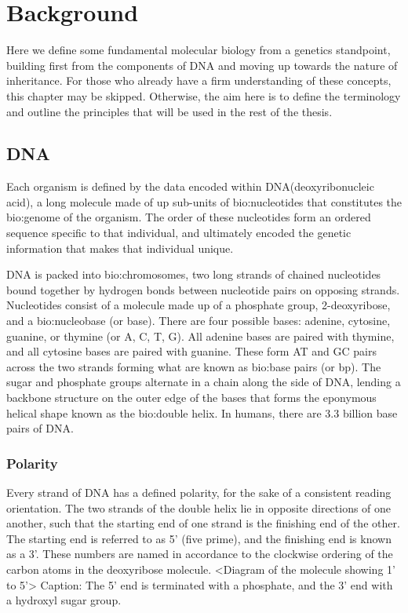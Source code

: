 

\chapter{Background}

Here we define some fundamental molecular biology from a genetics standpoint, building first from the components of DNA and moving up towards the nature of inheritance. For those who already have a firm understanding of these concepts, this chapter may be skipped. Otherwise, the aim here is to define the terminology and outline the principles that will be used in the rest of the thesis.

\section{DNA}

Each organism is defined by the data encoded within DNA(deoxyribonucleic acid), a long molecule made of up sub-units of \gls{bio:nucleotides} that constitutes the \gls{bio:genome} of the organism. The order of these nucleotides form an ordered sequence specific to that individual, and ultimately encoded the genetic information that makes that individual unique.

DNA is packed into \gls{bio:chromosomes}, two long strands of chained nucleotides bound together by hydrogen bonds between nucleotide pairs on opposing strands. Nucleotides consist of a molecule made up of a phosphate group, 2-deoxyribose, and a \gls{bio:nucleobase} (or base). There are four possible bases: adenine, cytosine, guanine, or thymine (or A, C, T, G).  All adenine bases are paired with thymine, and all cytosine bases are paired with guanine. 
These form AT and GC pairs across the two strands forming what are known as \gls{bio:base pairs} (or bp).
The sugar and phosphate groups alternate in a chain along the side of DNA, lending a backbone structure on the outer edge of the bases that forms the eponymous helical shape known as the \gls{bio:double helix}.  In humans, there are 3.3 billion base pairs of DNA.


\subsection{Polarity}

Every strand of DNA has a defined polarity, for the sake of a consistent reading orientation. The two strands of the double helix lie in opposite directions of one another, such that the starting end of one strand is the finishing end of the other.
The starting end is referred to as 5' (five prime), and the finishing end is known as a 3'. These numbers are named in accordance to the clockwise ordering of the carbon atoms in the deoxyribose molecule. 
<Diagram of the molecule showing 1' to 5'>
Caption: The 5' end is terminated with a phosphate, and the 3' end with a hydroxyl sugar group.

